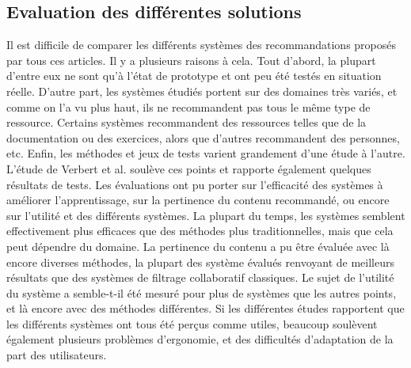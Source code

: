 \documentclass[conference]{./sty/IEEEtran}
\begin{document}
\subsection{Evaluation des différentes solutions}
Il est difficile de comparer les différents systèmes des recommandations proposés par tous ces articles. Il y a plusieurs raisons à cela. Tout d'abord, la plupart d'entre eux ne sont qu'à l'état de prototype et ont peu été testés en situation réelle. D'autre part, les systèmes étudiés portent sur des domaines très variés, et comme on l'a vu plus haut, ils ne recommandent pas tous le même type de ressource. Certains systèmes recommandent des ressources telles que de la documentation ou des exercices, alors que d'autres recommandent des personnes, etc. Enfin, les méthodes et jeux de tests varient grandement d'une étude à l'autre.\\

L'étude de Verbert et al. \cite{DBLP:journals/tlt/VerbertMOWDBD12} soulève ces points et rapporte également quelques résultats de tests. Les évaluations ont pu porter sur l'efficacité des systèmes à améliorer l'apprentissage, sur la pertinence du contenu recommandé, ou encore sur l'utilité et des différents systèmes. La plupart du temps, les systèmes semblent effectivement plus efficaces que des méthodes plus traditionnelles, mais que cela peut dépendre du domaine. La pertinence du contenu a pu être évaluée avec là encore diverses méthodes, la plupart des système évalués renvoyant de meilleurs résultats que des systèmes de filtrage collaboratif classiques. Le sujet de l'utilité du système a semble-t-il été mesuré pour plus de systèmes que les autres points, et là encore avec des méthodes différentes. Si les différentes études rapportent que les différents systèmes ont tous été perçus comme utiles, beaucoup soulèvent également plusieurs problèmes d'ergonomie, et des difficultés d'adaptation de la part des utilisateurs.\\
\end{document}
